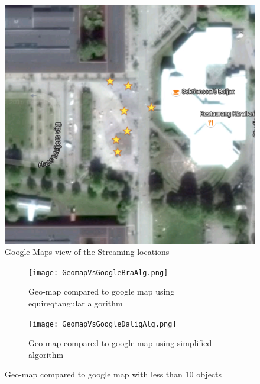 \begin{figure}[ht!]
\begin{center}
	\includegraphics[scale=0.64]{Google_Maps.png}
	\caption{Google Maps view of the Streaming locations}
	\label{fig:googlemaps}
\end{center}
\end{figure}

\begin{figure}
\begin{subfigure}[b]{0.5\textwidth}
        \texttt{[image: GeomapVsGoogleBraAlg.png]}
        \caption{Geo-map compared to google map using equireqtangular algorithm}
        \label{fig:GeomapVsGoogleBraAlg}
    \end{subfigure}\hfill 
    \hspace{3px}
    \begin{subfigure}[b]{0.5\textwidth}
        \texttt{[image: GeomapVsGoogleDaligAlg.png]}
        \caption{Geo-map compared to google map using simplified algorithm}
        \label{fig:tiger}
    \label{fig:GeomapVsGoogleDaligAlg}
    \end{subfigure}
	\caption{Geo-map compared to google map with less than 10 objects}
	\label{fig:GeomapVsGoogleWithLessThan10objects}
\end{figure}

